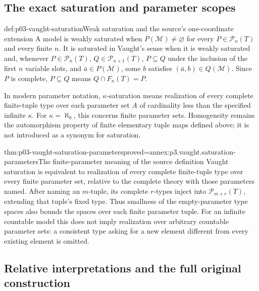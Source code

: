 \subsection{The exact saturation and parameter scopes}
\label{sec:p03-vaught-saturation}

\begin{hbdefinition}{def:p03-vaught-saturation}{Weak saturation and the source's one-coordinate extension}
A model is weakly saturated when \(P(\mathcal M)\ne\varnothing\)
for every \(P\in\mathcal P_n(T)\) and every finite \(n\).
It is saturated in Vaught's sense when it is weakly saturated and,
whenever \(P\in\mathcal P_n(T)\), \(Q\in\mathcal P_{n+1}(T)\),
\(P\subseteq Q\) under the inclusion of the first \(n\) variable slots,
and \(\bar a\in P(\mathcal M)\), some \(b\) satisfies
\((\bar a,b)\in Q(\mathcal M)\).
Since \(P\) is complete, \(P\subseteq Q\) means
\(Q\cap F_n(T)=P\).

In modern parameter notation, \(\kappa\)-saturation means realization
of every complete finite-tuple type over each parameter set \(A\)
of cardinality less than the specified infinite \(\kappa\).
For \(\kappa=\aleph_0\), this concerns finite parameter sets.
Homogeneity remains the automorphism property of finite elementary
tuple maps defined above; it is not introduced as a synonym for saturation.
\end{hbdefinition}

\begin{hblemma}{thm:p03-vaught-saturation-parameters}{proved=annex:p3.vaught.saturation-parameters}{The finite-parameter meaning of the source definition}
Vaught saturation is equivalent to realization of every complete
finite-tuple type over every finite parameter set, relative to the
complete theory with those parameters named.
After naming an \(m\)-tuple, its complete \(r\)-types inject into
\(\mathcal P_{m+r}(T)\), extending that tuple's fixed type.
Thus smallness of the empty-parameter type spaces also bounds
the spaces over each finite parameter tuple.
For an infinite countable model this does not imply realization
over arbitrary countable parameter sets: a consistent type asking
for a new element different from every existing element is omitted.
\end{hblemma}

\subsection{Relative interpretations and the full original construction}
\label{sec:p03-vaught-relative-saturation}

